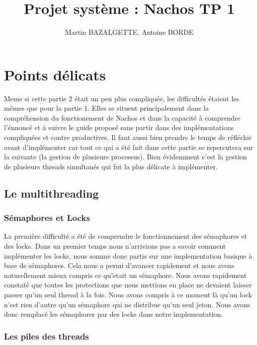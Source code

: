 \documentclass[12pt]{article}
\begin{document}
\title{Projet système : Nachos TP 1}
\author{Martin BAZALGETTE, Antoine BORDE}
\maketitle

\newpage
\tableofcontents
\newpage

\section {Points délicats}

Meme si cette partie 2 était un peu plus compliquée, les difficultés étaient les mêmes
que pour la partie 1. Elles se situent principalement dans la compréhension du fonctionement
de Nachos et dans la capacité à comprendre l'énnoncé et à suivre le guide proposé sans
partir dans des implémentations compliquées et contre productives. Il faut aussi
bien prendre le temps de réfléchir avant d'implémenter car tout ce qui a été fait dans
cette partie se repercutera sur la suivante (la gestion de plusieurs processus).
\newline
Bien évidemment c'est la gestion de plusieurs threads simultanés qui fut la plus délicate
à implémenter.

\subsection{Le multithreading}
\subsubsection{Sémaphores et Locks}
La première difficulté a été de comprendre le fonctionnement des sémaphores et des locks.
Dans un premier temps nous n'arrivions pas a savoir comment implémenter les locks, nous somme
donc partis sur une implementation basique à base de sémaphores. Cela nous a permi d'avancer
rapidement et nous avons naturellement mieux compris ce qu'etait un sémaphore.
Nous avons rapidement constaté que toutes les protections que nous mettions en place ne
devaient laisser passer qu'un seul thread à la fois. Nous avons compris à ce moment là qu'un
lock n'est rien d'autre qu'un sémaphore qui ne distribue qu'un seul jeton.
Nous avons donc remplacé les sémaphores par des locks dans notre implementation.

\subsubsection{Les piles des threads}
\end{document}
